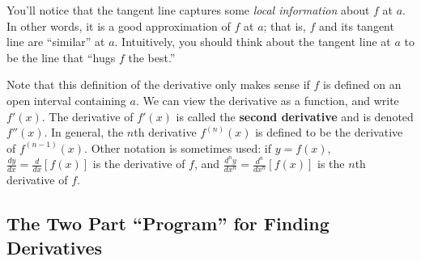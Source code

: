 \documentclass{article}
\theoremstyle{definition}
\theoremstyle{definition}
\begin{document}
\begin{multicols}{2}
{

}

\end{multicols}


You'll notice that the tangent line captures some \textit{local information} about $f$ at $a$. In other words, it is a good approximation of $f$ at $a$; that is, $f$ and its tangent line are ``similar'' at $a$. Intuitively, you should think about the tangent line at $a$ to be the line that ``hugs $f$ the best.''

Note that this definition of the derivative only makes sense if $f$ is defined on an open interval containing $a$. We can view the derivative as a function, and write $f'(x)$. The derivative of $f'(x)$ is called the \textbf{second derivative} and is denoted $f''(x)$. In general, the $n$th derivative $f^{(n)}(x)$ is defined to be the derivative of $f^{(n-1)}(x)$. Other notation is sometimes used: if $y=f(x)$, $\frac{dy}{dx}=\frac{d}{dx}[f(x)]$ is the derivative of $f$, and $\frac{d^ny}{dx^n}=\frac{d^n}{dx^n}[f(x)]$ is the $n$th derivative of $f$.


\subsection{The Two Part ``Program'' for Finding Derivatives}
\end{document}
